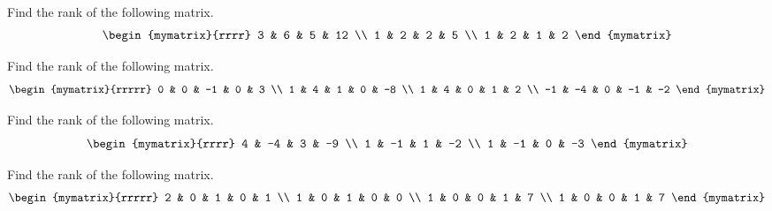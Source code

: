 \begin{enumialphparenastyle}
\begin{ex} Find the rank of the following matrix.
\begin{equation*}
\begin{mymatrix}{rrrr}
3 & 6 & 5 & 12 \\
1 & 2 & 2 & 5 \\
1 & 2 & 1 & 2
\end{mymatrix}
\end{equation*}
\end{ex}

\begin{ex} Find the rank of the following matrix.
\begin{equation*}
\begin{mymatrix}{rrrrr}
0 & 0 & -1 & 0 & 3 \\
1 & 4 & 1 & 0 & -8 \\
1 & 4 & 0 & 1 & 2 \\
-1 & -4 & 0 & -1 & -2
\end{mymatrix}
\end{equation*}
\end{ex}

\begin{ex} Find the rank of the following matrix.
\begin{equation*}
\begin{mymatrix}{rrrr}
4 & -4 & 3 & -9 \\
1 & -1 & 1 & -2 \\
1 & -1 & 0 & -3
\end{mymatrix}
\end{equation*}
\end{ex}

\begin{ex} Find the rank of the following matrix.
\begin{equation*}
\begin{mymatrix}{rrrrr}
2 & 0 & 1 & 0 & 1 \\
1 & 0 & 1 & 0 & 0 \\
1 & 0 & 0 & 1 & 7 \\
1 & 0 & 0 & 1 & 7
\end{mymatrix}
\end{equation*}
\end{ex}


\end{enumialphparenastyle}
